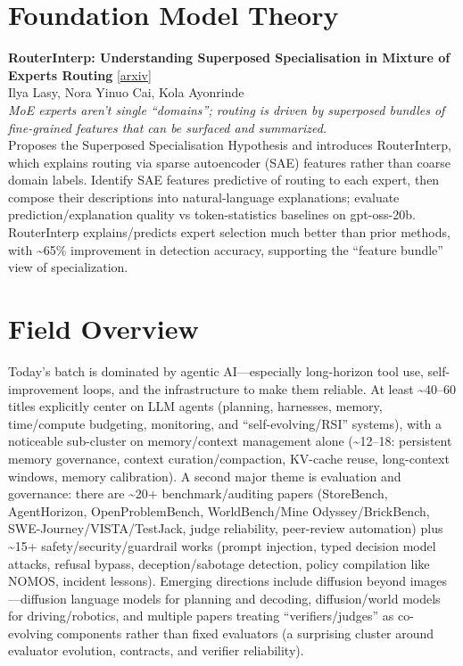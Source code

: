 \documentclass[12pt,letterpaper]{article}
\begin{document}
\medskip


\section*{Foundation Model Theory}

{\small\textbf{RouterInterp: Understanding Superposed Specialisation in Mixture of Experts Routing}} {\scriptsize[\href{https://arxiv.org/abs/2610.11775}{arxiv}]}\\
{\scriptsize Ilya Lasy, Nora Yinuo Cai, Kola Ayonrinde}\\

{\small\textit{MoE experts aren't single ``domains''; routing is driven by superposed bundles of fine-grained features that can be surfaced and summarized.}}\\[1pt]
{\footnotesize Proposes the Superposed Specialisation Hypothesis and introduces RouterInterp, which explains routing via sparse autoencoder (SAE) features rather than coarse domain labels. Identify SAE features predictive of routing to each expert, then compose their descriptions into natural-language explanations; evaluate prediction/explanation quality vs token-statistics baselines on gpt-oss-20b. RouterInterp explains/predicts expert selection much better than prior methods, with \textasciitilde{}65\% improvement in detection accuracy, supporting the ``feature bundle'' view of specialization.}

\medskip



\section*{Field Overview}
{\footnotesize Today's batch is dominated by agentic AI---especially long-horizon tool use, self-improvement loops, and the infrastructure to make them reliable. At least \textasciitilde{}40--60 titles explicitly center on LLM agents (planning, harnesses, memory, time/compute budgeting, monitoring, and ``self-evolving/RSI'' systems), with a noticeable sub-cluster on memory/context management alone (\textasciitilde{}12--18: persistent memory governance, context curation/compaction, KV-cache reuse, long-context windows, memory calibration). A second major theme is evaluation and governance: there are \textasciitilde{}20+ benchmark/auditing papers (StoreBench, AgentHorizon, OpenProblemBench, WorldBench/Mine Odyssey/BrickBench, SWE-Journey/VISTA/TestJack, judge reliability, peer-review automation) plus \textasciitilde{}15+ safety/security/guardrail works (prompt injection, typed decision model attacks, refusal bypass, deception/sabotage detection, policy compilation like NOMOS, incident lessons). Emerging directions include diffusion beyond images---diffusion language models for planning and decoding, diffusion/world models for driving/robotics, and multiple papers treating ``verifiers/judges'' as co-evolving components rather than fixed evaluators (a surprising cluster around evaluator evolution, contracts, and verifier reliability).}
\end{document}
